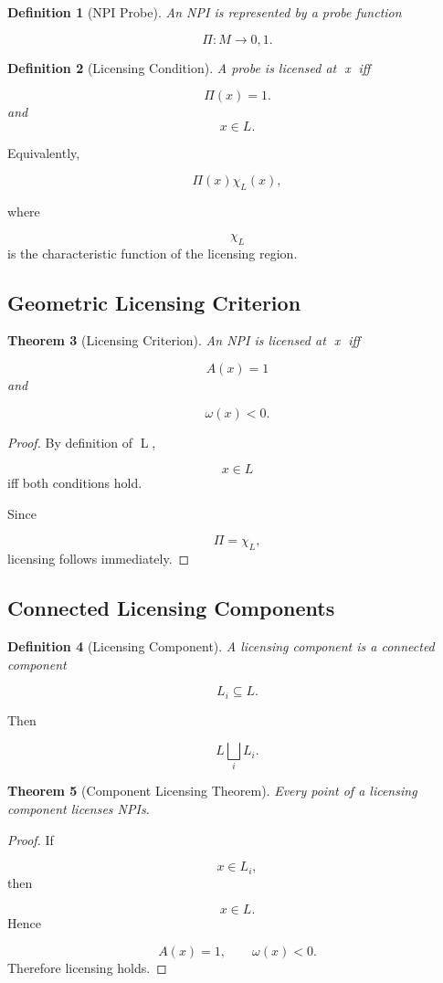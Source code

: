 \documentclass[12pt]{article}
\newtheorem{theorem}{Theorem}[section]
\newtheorem{definition}[theorem]{Definition}
\theoremstyle{remark}
\begin{document}
\begin{definition}[NPI Probe]
An NPI is represented by a probe function

\[
\Pi:M\rightarrow{0,1}.
\]
\end{definition}
\begin{definition}[Licensing Condition]
A probe is licensed at x iff

\[
\Pi(x)=1.
\]
\]
and
\[
x\in L.
\]
\end{definition}
Equivalently,

\[
\Pi(x)
\chi_L(x),
\]

where

\[
\chi_L
\]
is the characteristic function of the licensing region.

\subsection{Geometric Licensing Criterion}

\begin{theorem}[Licensing Criterion]
An NPI is licensed at x iff

\[
A(x)=1
\]
and

\[
\omega(x)<0.
\]
\end{theorem}
\begin{proof}
By definition of L,

\[
x\in L
\]
iff both conditions hold.

Since

\[
\Pi=\chi_L,
\]
licensing follows immediately.
\end{proof}

\subsection{Connected Licensing Components}

\begin{definition}[Licensing Component]
A licensing component is a connected component

\[
L_i
\subseteq
L.
\]
\end{definition}
Then

\[
L
\bigsqcup_i
L_i.
\]

\begin{theorem}[Component Licensing Theorem]
Every point of a licensing component licenses NPIs.
\end{theorem}

\begin{proof}
If

\[
x\in L_i,
\]
then

\[
x\in L.
\]
Hence

\[
A(x)=1,
\qquad
\omega(x)<0.
\]
Therefore licensing holds.
\end{proof}
\end{document}
